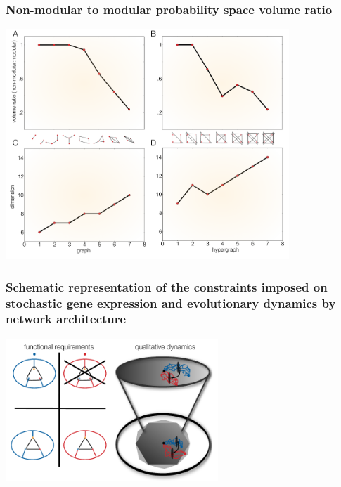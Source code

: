 \begin{frame}
\vspace{1em}
\frametitle{Non-modular to modular probability space volume ratio}
\begin{center}
\includegraphics[width=0.8\textwidth]{fig/figure_graphs_dims_nolines.pdf}\\
\end{center}
\end{frame}

\begin{frame}
\vspace{1em}
\frametitle{Schematic representation of the constraints imposed on stochastic gene expression and evolutionary dynamics by network architecture}
\begin{center}
\includegraphics[width=0.6\textwidth]{fig/stochdynscheme.pdf}\\
\end{center}
\end{frame}
